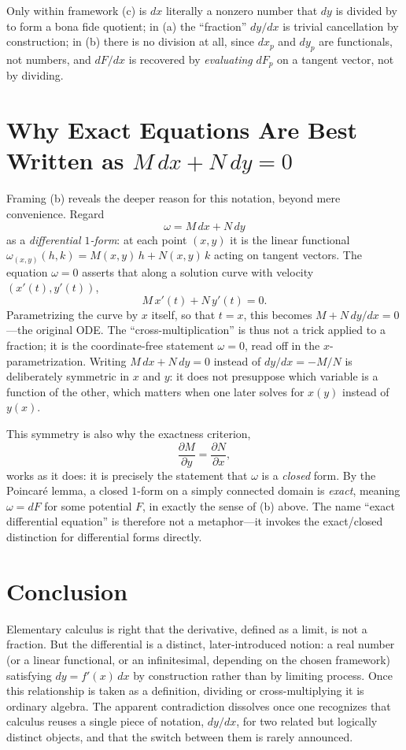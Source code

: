 \documentclass{essay}
\begin{document}
Only within framework (c) is \(dx\) literally a nonzero number that \(dy\) is divided by to form a bona fide quotient; in (a) the ``fraction'' \(dy/dx\) is trivial cancellation by construction; in (b) there is no division at all, since \(dx_{p}\) and \(dy_{p}\) are functionals, not numbers, and \(dF/dx\) is recovered by \emph{evaluating} \(dF_{p}\) on a tangent vector, not by dividing.

\section{Why Exact Equations Are Best Written as \(M\,dx + N\,dy = 0\)}

Framing (b) reveals the deeper reason for this notation, beyond mere convenience. Regard
\[ \omega = M\,dx + N\,dy \]
as a \emph{differential \(1\)-form}: at each point \((x,y)\) it is the linear functional \(\omega_{(x,y)}(h,k) = M(x,y)\,h + N(x,y)\,k\) acting on tangent vectors. The equation \(\omega = 0\) asserts that along a solution curve with velocity \((x'(t), y'(t))\),
\[ M\,x'(t) + N\,y'(t) = 0. \]
Parametrizing the curve by \(x\) itself, so that \(t = x\), this becomes \(M + N\,dy/dx = 0\)---the original ODE. The ``cross-multiplication'' is thus not a trick applied to a fraction; it is the coordinate-free statement \(\omega = 0\), read off in the \(x\)-parametrization. Writing \(M\,dx + N\,dy = 0\) instead of \(dy/dx = -M/N\) is deliberately symmetric in \(x\) and \(y\): it does not presuppose which variable is a function of the other, which matters when one later solves for \(x(y)\) instead of \(y(x)\).

This symmetry is also why the exactness criterion,
\[ \frac{\partial M}{\partial y} = \frac{\partial N}{\partial x}, \]
works as it does: it is precisely the statement that \(\omega\) is a \emph{closed} form. By the Poincar\'e lemma, a closed \(1\)-form on a simply connected domain is \emph{exact}, meaning \(\omega = dF\) for some potential \(F\), in exactly the sense of (b) above. The name ``exact differential equation'' is therefore not a metaphor---it invokes the exact/closed distinction for differential forms directly.

\section{Conclusion}

Elementary calculus is right that the derivative, defined as a limit, is not a fraction. But the differential is a distinct, later-introduced notion: a real number (or a linear functional, or an infinitesimal, depending on the chosen framework) satisfying \(dy = f'(x)\,dx\) by construction rather than by limiting process. Once this relationship is taken as a definition, dividing or cross-multiplying it is ordinary algebra. The apparent contradiction dissolves once one recognizes that calculus reuses a single piece of notation, \(dy/dx\), for two related but logically distinct objects, and that the switch between them is rarely announced.
\end{document}
